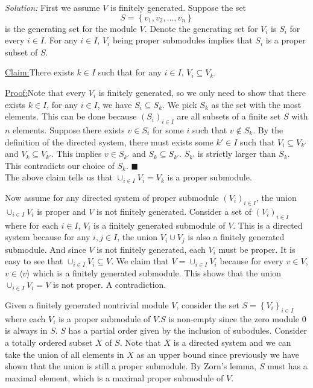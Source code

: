 \documentclass[a4paper, 12pt]{article}
\newenvironment{solution}
    {\textit{Solution:}}
    {}
\newenvironment{claim}[1]{\par\noindent\underline{Claim:}\space#1}{}
\newenvironment{claimproof}[1]{\par\noindent\underline{Proof:}\space#1}{\hfill $\blacksquare$}
\newcommand{\la}{\langle}
\newcommand{\ra}{\rangle}
\begin{document}
\begin{solution}
First we assume \(V\) is finitely generated. Suppose the set 
\[S=\left\{ v_1,v_2,\ldots,v_n \right\}\]
is the generating set for the module \(V\). Denote the generating set for \(V_i\) is \(S_i\) for every \(i\in I\). For any \(i\in I\), \(V_i\) being proper submodules implies that \(S_i\) is a proper 
subset of \(S\).

\begin{claim}
There exists \(k\in I\) such that for any \(i\in I\), \(V_i\subseteq V_k\).
\end{claim}
\begin{claimproof}
Note that every \(V_i\) is finitely generated, so we only need to show that there exists \(k\in I\), for any \(i\in I\), we have \(S_i\subseteq S_k\). We pick \(S_k\) as the set with the most elements. This can be done 
because \((S_i)_{i\in I}\) are all subsets of a finite set \(S\) with \(n\) elements. Suppose there exists \(v\in S_i\) for some \(i\) such that \(v\notin S_k\). By the definition of the directed system, there must exists some \(k'\in I\) such 
that \(V_i\subseteq V_{k'}\) and \(V_k\subseteq V_{k'}\). This implies \(v\in S_{k'}\) and \(S_k\subseteq S_{k'}\). \(S_{k'}\) is strictly larger than \(S_k\). This contradicts our choice of \(S_k\). 
\end{claimproof}\\
The above claim tells us that \(\cup_{i\in I}V_i=V_k\) is a proper submodule. 

Now assume for any directed system of proper submodule \((V_i)_{i\in I}\), the union \(\cup_{i\in I}V_i\) is proper and \(V\) is not finitely generated. Consider a set of \((V_i)_{i\in I}\) where for each \(i\in I\), \(V_i\) is a finitely generated submodule of \(V\). This is a directed 
system because for any \(i,j\in I\), the union \(V_i\cup V_j\) is also a finitely generated submodule. And since \(V\) is not finitely generated, each \(V_i\) must be proper. It is easy to see that \(\cup_{i\in I}V_i\subseteq V\). We claim that \(V=\cup_{i\in I}V_i\) because for every \(v\in V\), \(v\in \la v\ra\) which is a 
finitely generated submodule. This shows that the union \(\cup_{i\in I}V_i=V\) is not proper. A contradiction.

Given a finitely generated nontrivial module \(V\), consider the set \(S=\left\{ V_i \right\}_{i\in I}\) where each \(V_i\) is a proper submodule of \(V\).\(S\) is non-empty since the zero module \(0\) is always in \(S\). \(S\) has a partial order given by the inclusion of subodules. Consider a totally ordered subset \(X\) of \(S\). Note that 
\(X\) is a directed system and we can take the union of all elements in \(X\) as an upper bound since previously we have shown that the union is still a proper submodule. By Zorn's lemma, \(S\) must has a maximal element, which is a maximal proper submodule of \(V\).
\end{solution}
\end{document}
